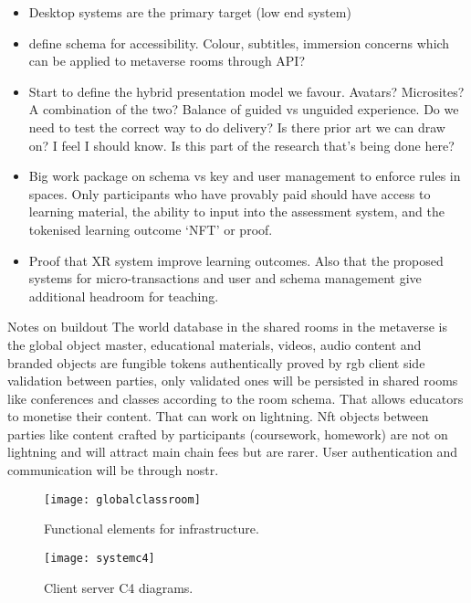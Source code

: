 \documentclass[
	11pt, %
	fleqn, %
	a4paper, %
]{LegrandOrangeBook}
\begin{document}
\begin{itemize}
\item Desktop systems are the primary target (low end system)
\item define schema for accessibility. Colour, subtitles, immersion concerns which can be applied to metaverse rooms through API?
\item Start to define the hybrid presentation model we favour. Avatars? Microsites? A combination of the two? Balance of guided vs unguided experience. Do we need to test the correct way to do delivery? Is there prior art we can draw on? I feel I should know. Is this part of the research that's being done here?
\item Big work package on schema vs key and user management to enforce rules in spaces. Only participants who have provably paid should have access to learning material, the ability to input into the assessment system, and the tokenised learning outcome `NFT' or proof.
\item Proof that XR system improve learning outcomes. Also that the proposed systems for micro-transactions and user and schema management give additional headroom for teaching.
\end{itemize}

Notes on buildout
The world database in the shared rooms in the metaverse is the global object master,  educational materials, videos,  audio content and branded objects are fungible tokens authentically proved by rgb client side validation between parties,  only validated ones will be persisted in shared rooms like conferences and classes according to the room schema. That allows educators to monetise their content.  That can work on lightning.  Nft objects between parties like content crafted by participants (coursework, homework) are not on lightning and will attract main chain fees but are rarer. User authentication and communication will be through nostr.

\begin{figure*}[ht]\centering %
	\texttt{[image: globalclassroom]}
	\caption{Functional elements for infrastructure.}
	\label{fig:globalclassroom}
\end{figure*}

\begin{figure*}[ht]\centering %
	\texttt{[image: systemc4]}
	\caption{Client server C4 diagrams.}
	\label{fig:globalclassroom}
\end{figure*}
\end{document}
